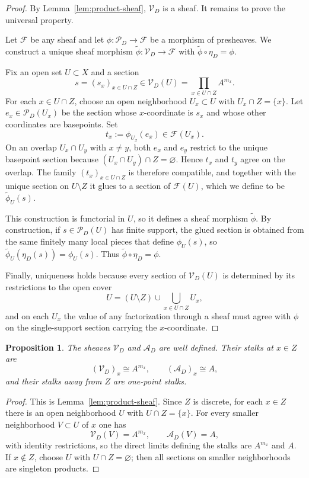 \documentclass[11pt,a4paper]{article}
\newtheorem{proposition}[theorem]{Proposition}
\theoremstyle{definition}
\theoremstyle{remark}
\newcommand{\cP}{\mathcal P}
\newcommand{\cV}{\mathcal V}
\newcommand{\cA}{\mathcal A}
\begin{document}
\begin{proof}
By Lemma~\ref{lem:product-sheaf}, $\cV_D$ is a sheaf.  It remains to prove the universal property.

Let $\mathcal F$ be any sheaf and let $\phi:\cP_D\to\mathcal F$ be a morphism of presheaves.  We construct a unique sheaf morphism $\widetilde\phi:\cV_D\to\mathcal F$ with $\widetilde\phi\circ\eta_D=\phi$.

Fix an open set $U\subset X$ and a section
\[
s=(s_x)_{x\in U\cap Z}\in\cV_D(U)=\prod_{x\in U\cap Z}A^{m_x}.
\]
For each $x\in U\cap Z$, choose an open neighborhood $U_x\subset U$ with $U_x\cap Z=\{x\}$.  Let $e_x\in\cP_D(U_x)$ be the section whose $x$-coordinate is $s_x$ and whose other coordinates are basepoints.  Set
\[
t_x:=\phi_{U_x}(e_x)\in\mathcal F(U_x).
\]
On an overlap $U_x\cap U_y$ with $x\neq y$, both $e_x$ and $e_y$ restrict to the unique basepoint section because $(U_x\cap U_y)\cap Z=\varnothing$.  Hence $t_x$ and $t_y$ agree on the overlap.  The family $(t_x)_{x\in U\cap Z}$ is therefore compatible, and together with the unique section on $U\setminus Z$ it glues to a section of $\mathcal F(U)$, which we define to be $\widetilde\phi_U(s)$.

This construction is functorial in $U$, so it defines a sheaf morphism $\widetilde\phi$.  By construction, if $s\in\cP_D(U)$ has finite support, the glued section is obtained from the same finitely many local pieces that define $\phi_U(s)$, so $\widetilde\phi_U(\eta_D(s))=\phi_U(s)$.  Thus $\widetilde\phi\circ\eta_D=\phi$.

Finally, uniqueness holds because every section of $\cV_D(U)$ is determined by its restrictions to the open cover
\[
U=(U\setminus Z)\cup\bigcup_{x\in U\cap Z}U_x,
\]
and on each $U_x$ the value of any factorization through a sheaf must agree with $\phi$ on the single-support section carrying the $x$-coordinate.
\end{proof}

\begin{proposition}\label{prop:shadow-stalks}
The sheaves $\cV_D$ and $\cA_D$ are well defined.  Their stalks at $x\in Z$ are
\[
(\cV_D)_x\cong A^{m_x},\qquad (\cA_D)_x\cong A,
\]
and their stalks away from $Z$ are one-point stalks.
\end{proposition}

\begin{proof}
This is Lemma~\ref{lem:product-sheaf}.  Since $Z$ is discrete, for each $x\in Z$ there is an open neighborhood $U$ with $U\cap Z=\{x\}$.  For every smaller neighborhood $V\subset U$ of $x$ one has
\[
\cV_D(V)=A^{m_x},\qquad \cA_D(V)=A,
\]
with identity restrictions, so the direct limits defining the stalks are $A^{m_x}$ and $A$.  If $x\notin Z$, choose $U$ with $U\cap Z=\varnothing$; then all sections on smaller neighborhoods are singleton products.
\end{proof}
\end{document}
